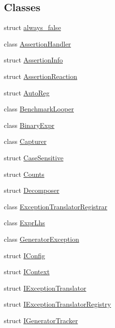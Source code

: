 \subsection*{Classes}
\begin{DoxyCompactItemize}
\item 
struct \mbox{\hyperlink{struct_catch_1_1always__false}{always\+\_\+false}}
\item 
class \mbox{\hyperlink{class_catch_1_1_assertion_handler}{Assertion\+Handler}}
\item 
struct \mbox{\hyperlink{struct_catch_1_1_assertion_info}{Assertion\+Info}}
\item 
struct \mbox{\hyperlink{struct_catch_1_1_assertion_reaction}{Assertion\+Reaction}}
\item 
struct \mbox{\hyperlink{struct_catch_1_1_auto_reg}{Auto\+Reg}}
\item 
class \mbox{\hyperlink{class_catch_1_1_benchmark_looper}{Benchmark\+Looper}}
\item 
class \mbox{\hyperlink{class_catch_1_1_binary_expr}{Binary\+Expr}}
\item 
class \mbox{\hyperlink{class_catch_1_1_capturer}{Capturer}}
\item 
struct \mbox{\hyperlink{struct_catch_1_1_case_sensitive}{Case\+Sensitive}}
\item 
struct \mbox{\hyperlink{struct_catch_1_1_counts}{Counts}}
\item 
struct \mbox{\hyperlink{struct_catch_1_1_decomposer}{Decomposer}}
\item 
class \mbox{\hyperlink{class_catch_1_1_exception_translator_registrar}{Exception\+Translator\+Registrar}}
\item 
class \mbox{\hyperlink{class_catch_1_1_expr_lhs}{Expr\+Lhs}}
\item 
class \mbox{\hyperlink{class_catch_1_1_generator_exception}{Generator\+Exception}}
\item 
struct \mbox{\hyperlink{struct_catch_1_1_i_config}{I\+Config}}
\item 
struct \mbox{\hyperlink{struct_catch_1_1_i_context}{I\+Context}}
\item 
struct \mbox{\hyperlink{struct_catch_1_1_i_exception_translator}{I\+Exception\+Translator}}
\item 
struct \mbox{\hyperlink{struct_catch_1_1_i_exception_translator_registry}{I\+Exception\+Translator\+Registry}}
\item 
struct \mbox{\hyperlink{struct_catch_1_1_i_generator_tracker}{I\+Generator\+Tracker}}
\item 

\end{DoxyCompactItemize}

